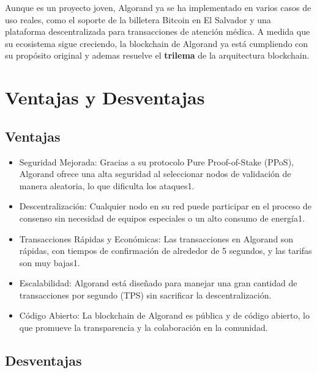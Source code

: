 \documentclass{article}
\begin{document}
Aunque es un proyecto joven, Algorand ya se ha implementado en varios casos de uso reales, como el soporte de la billetera Bitcoin en El Salvador y una plataforma descentralizada para transacciones de atención médica. A medida que su ecosistema sigue creciendo, la blockchain de Algorand ya está cumpliendo con su propósito original y ademas resuelve el \textbf{trilema} de la arquitectura blockchain.

\section{Ventajas y Desventajas}

\subsection{Ventajas}

\begin{itemize}
    \item Seguridad Mejorada: Gracias a su protocolo Pure Proof-of-Stake (PPoS), Algorand ofrece una alta seguridad al seleccionar nodos de validación de manera aleatoria, lo que dificulta los ataques1.
    \item Descentralización: Cualquier nodo en su red puede participar en el proceso de consenso sin necesidad de equipos especiales o un alto consumo de energía1.
    \item Transacciones Rápidas y Económicas: Las transacciones en Algorand son rápidas, con tiempos de confirmación de alrededor de 5 segundos, y las tarifas son muy bajas1.
    \item Escalabilidad: Algorand está diseñado para manejar una gran cantidad de transacciones por segundo (TPS) sin sacrificar la descentralización.
    \item Código Abierto: La blockchain de Algorand es pública y de código abierto, lo que promueve la transparencia y la colaboración en la comunidad.
\end{itemize}

\subsection{Desventajas}
\end{document}
